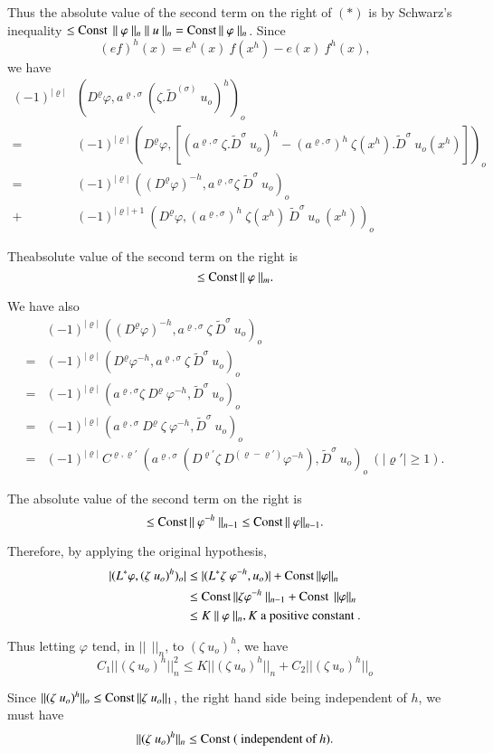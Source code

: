 Thus the absolute value of the second term on the right of $(*)$ is by
Schwarz's inequality $\le \operatorname{Const} ~ || ~ \varphi ~ ||_n ~ || ~ u ~ ||_n
= \operatorname{Const} || ~ \varphi ~ ||_n$. Since 
$$
(ef)^h (x) = e^h(x) ~ f(x^h) - e(x) ~ f^h(x),
$$
we have 
\begin{align*}
  (-1)^{|\varrho|} & (D^{\varrho} \varphi, a^{\varrho,\sigma}
 ~(\zeta.\tilde{D}^{(\sigma)} ~u_o)^h)_o\\ 
 = & (-1)^{|\varrho|} ~ (D^\varrho \varphi,[(a^{\varrho,\sigma}
  ~\zeta.\tilde{D}^{\sigma} ~ u_o)^h - (a^{\varrho,\sigma})^h ~
  \zeta(x^h). \tilde{D}^\sigma ~ u_o (x^h)])_o\\ 
 = & (-1)^{|\varrho|} ~ ((D^{\varrho}\varphi)^{-h},
 a^{\varrho,\sigma} \zeta ~ \tilde{D}^\sigma ~ u_o)_o\\ 
 + & (-1)^{|\varrho|+1} ~ (D^\varrho \varphi, (a^{\varrho,\sigma})^h
 ~ \zeta (x^h) ~ \tilde{D}^\sigma ~ u_o ~ (x^h))_o 
\end{align*}

The\pageoriginale absolute value of the second term on the right is
$$
\le \operatorname{Const} || ~ \varphi ~ ||_m. 
$$

We have also
\begin{align*}
 & (-1)^{| \varrho |} ~ ((D^\varrho\varphi)^{-h}, a^{\varrho,\sigma}
 ~ \zeta ~\tilde{D}^\sigma ~ u_o)_o\\ 
 = & (-1)^{| \varrho |} ~ (D^\varrho\varphi^{-h}, a^{\varrho,\sigma}
 ~ \zeta ~\tilde{D}^\sigma ~ u_o)_o\\ 
 = & (-1)^{| \varrho |} ~(a^{\varrho,\sigma} \zeta ~ D^\varrho ~
 \varphi^{-h}, \tilde{D}^\sigma ~ u_o)_o\\ 
 = & (-1)^{| \varrho |} ~(a^{\varrho,\sigma} ~ D^\varrho ~\zeta ~
 \varphi^{-h}, \tilde{D}^\sigma ~ u_o)_o\\ 
 = & (-1)^{|\varrho|} ~ C^{\varrho,\varrho'} ~ (a^{\varrho,\sigma}
 ~(D^{\varrho'} \zeta ~D^{(\varrho-\varrho')}
 \varphi^{-h}),\tilde{D}^{\sigma} ~ u_o)_o ~ (| \varrho' | \ge 1). 
\end{align*}

The absolute value of the second term on the right is
$$
\le \operatorname{Const} ||~ \varphi^{-h} ~||_{n-1} \le \operatorname{Const} || ~ \varphi ||_{n-1}.
$$

Therefore, by applying the original hypothesis,
\begin{align*}
 | (L^*\varphi,(\zeta ~ u_o)^h)_o| & \le | (L^* \zeta ~ \varphi^{-h},
 u_o) | + \operatorname{Const} || \varphi ||_n\\ 
 & \le \operatorname{Const} || \zeta \varphi^{-h} ~||_{n-1} + \operatorname{Const} ~ || \varphi ||_n\\
 & \le K ~ || ~ \varphi ~ ||_n, K \text{ a positive constant }.
\end{align*}

Thus letting $\varphi$ tend, in $|| ~~ ||_n$, to $(\zeta ~ u_o)^h$, we
have 
$$
C_1 || (\zeta ~ u_o)^h ||^2_n \le K || (\zeta ~ u_o)^h ||_n + C_2 ||
(\zeta ~ u_o)^h ||_o 
$$

Since $|| (\zeta ~ u_o)^h ||_o \le \operatorname{Const} || \zeta ~ u_o ||_1$, the
right hand side being independent of $h$, we must have 
$$
|| (\zeta ~ u_o)^h ||_n \le \operatorname{Const} ~ (\text{ independent of } h).
$$
